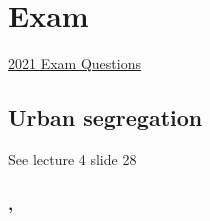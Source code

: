 \documentclass{article}
\begin{document}

\section{Exam}

\href{https://bakexamenwiki.wordpress.com/urban-geography/?fbclid=IwAR1qxA_V_G9I3NVC_17dFMUmEMLisoLB-XfgdqZmQNxIsUydvhO_ZnCOFVU}{2021 Exam Questions}

\subsection{Urban segregation}

See lecture 4 slide 28


\subsubsection{, \textit{}}

\begin{outline}
	\1
\end{outline}


\fi
\end{document}
